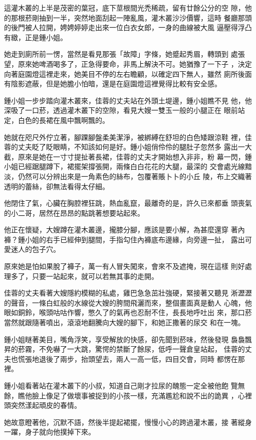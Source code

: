 這灌木叢的上半是茂密的葉冠，底下莖根間光禿稀疏，留有廿餘公分的空
隙，他的那根菸剛抽到一半，突然地面刮起一陣亂風，灌木叢沙沙價響，這時
餐廳那頭的後門被人拉開，娉娉婷婷走出來一位白衣女郎，一身的曲線被大風
逼壓得浮凸有緻，正是鍾小姐。

她走到廁所前一愣，當然是看見那張「故障」字條，她蹙起秀眉，轉頭到
處張望，原來她啤酒喝多了，正急得要命，非馬上解決不可。她猶豫了一下子
，決定向著庭園燈這裡走來，她美目不停的左右瞻顧，以確定四下無人，雖然
廁所後面有陰影遮蔽，但是她膽小怕暗，還是在庭園燈這裡覺得比較有安全感。

鍾小姐一步步踏向灌木叢來，佳蓉的丈夫站在外頭土堤邊，鍾小姐瞧不見
他，他深吸了一口菸，透過灌木叢下的空隙，看見大嫂一雙玉一般的小腿正在
眼前站定，白色的長裙在風中飄啊飄的。

她就在咫尺外佇立著，腳踝腳盤柔美潔淨，被綁縛在舒坦的白色矮跟涼鞋
裡，佳蓉的丈夫眨了眨眼睛，不知該如何是好。鍾小姐俏伶伶的腿肚子忽然多
露出一大截，原來是她在一寸寸提扯著長裙，佳蓉的丈夫才開始想入非非，粉
幕一閃，鍾小姐已經踞腿蹲下，裙擺架撐張開，兩條白白花花的大腿，最深的
交會處光線黯淡，仍然可以分辨出來是一角素色的絲布，包覆著賬卜卜的小丘
陵，布上交織著透明的蕾絲，卻無法看得太仔細。

他閉住了氣，心臟在胸腔裡狂跳，熱血亂竄，最離奇的是，許久已來都垂
頭喪氣的小二哥，居然在昂昂的點跳著想要站起來。

他正在懷疑，大嫂蹲在灌木叢邊，攏膝分腳，應該是要小解，為甚麼還穿
著內褲？鍾小姐的右手已經伸到腿間，手指勾住內褲底布邊緣，向旁邊一扯，
露出可愛迷人的包子穴。

原來她是怕如果脫了褲子，萬一有人冒失闖來，會來不及遮掩，現在這樣
則好處理多了，只要一站起來，就可以若無其事的走開。

佳蓉的丈夫看著大嫂隱約模糊的私處，雞巴急急茁壯強硬，緊接著又聽見
淅瀝瀝的聲音，一條白虹般的水線從大嫂的胯間飛灑而來，整個畫面真是動人
心魄，他眼如銅鈴，喉頭咕咕作響，憋久了的氣再也忍耐不住，長長地呼吐出
來，那口菸當然就跟隨著噴出，滾滾地翻騰向大嫂的腳下，和她正撒著的尿交
和在一塊。

鍾小姐瞇著美目，嘴角浮笑，享受解放的快感，卻先聞到菸味，然後發現
裊裊飄昇的菸霧，不免嚇了一大跳，驚愕的禁斷了餘尿，低呼一聲倉皇站起，
佳蓉的丈夫也慌張地退後了兩步，抬頭望去，兩人一高一低，四目交會，同時
都愣在那裡。

鍾小姐看著站在灌木叢下的小叔，知道自己剛才拉尿的醜態一定全被他飽
覽無餘，瞧他臉上像足了做壞事被捉到的小孩一樣，充滿尷尬和說不出的詭異
，心裡頭突然漾起頑皮的春情。

她故意瞪著他，沉默不語，然後半提起裙擺，慢慢小心的跨過灌木叢，接
著縱身一躍，身子就向他撲掉下來。

